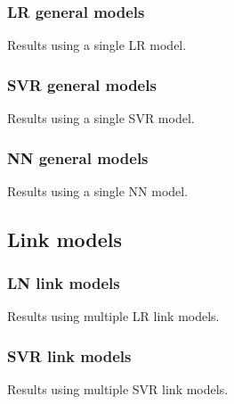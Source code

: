 \documentclass[11pt]{article}
\begin{document}
\subsubsection{LR general models}

\begin{table}[!ht]
    \center
    \footnotesize
    
    \caption{Results using a single LR model.}
\end{table}

\subsubsection{SVR general models}

\begin{table}[!ht]
    \center
    \footnotesize
    
    \caption{Results using a single SVR model.}
\end{table}

\subsubsection{NN general models}

\begin{table}[!ht]
    \center
    \footnotesize
    
    \caption{Results using a single NN model.}
\end{table}



\subsection{Link models}

\subsubsection{LN link models}

\begin{table}[!ht]
    \center
    \footnotesize
    
    \caption{Results using multiple LR link models.}
\end{table}

\subsubsection{SVR link models}

\begin{table}[!ht]
    \center
    \footnotesize
    
    \caption{Results using multiple SVR link models.}
\end{table}
\end{document}
